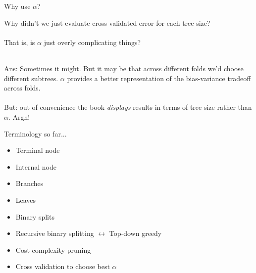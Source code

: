 \documentclass[mathserif, aspectratio=169]{beamer}
\begin{document}
\begin{frame}{Why use $\alpha$?}

Why didn't we just evaluate cross validated error for each tree size?\\~\\

That is, is $\alpha$ just overly complicating things?\\~\\

\pause

Ans: Sometimes it might.  But it may be that across different folds we'd choose different subtrees.  $\alpha$ provides a better representation of the bias-variance tradeoff across folds.  \\~\\

But: out of convenience the book \textit{displays} results in terms of tree size rather than $\alpha$.  Argh!

\end{frame}


\begin{frame}{Terminology so far...}
	\begin{itemize}
		\item Terminal node
		\item Internal node
		\item Branches
		\item Leaves
		\item Binary splits
		\item Recursive binary splitting $\leftrightarrow$ Top-down greedy 
		\pause
		\item Cost complexity pruning
		\item Cross validation to choose best $\alpha$
	\end{itemize}
\end{frame}

\end{document}
